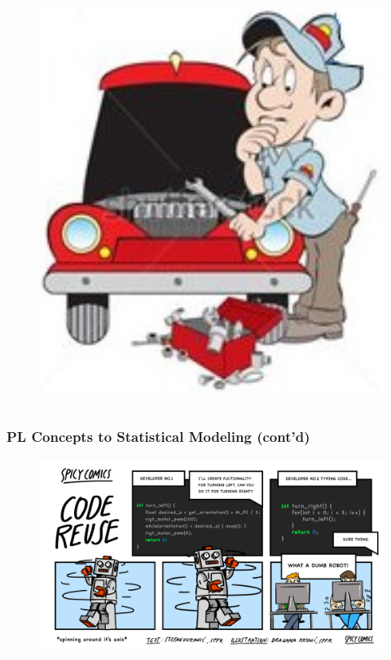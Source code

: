 \documentclass[usenames,dvipsnames]{beamer}
\begin{document}
\begin{frame}
\begin{columns}
\begin{column}{.48\textwidth}
\begin{figure}[ht]
        \includegraphics[width=1.0\textwidth,height=0.65\textheight]{figures/abstraction2.png}
        \caption*{\label{fig:abstration2}}
      \end{figure}
    \end{column}
  \end{columns}
\end{frame}
\begin{frame}
  \frametitle{PL Concepts to Statistical Modeling (cont'd)}
  \begin{figure}[ht]
    \centering
    \includegraphics[width=1.0\textwidth,height=0.75\textheight]{figures/reuse.png}
    \caption*{\label{fig:reuse}}
  \end{figure}
\end{frame}
\end{document}
